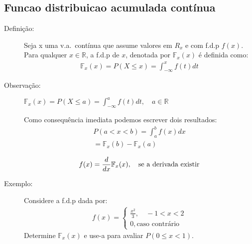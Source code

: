  \subsection{Funcao distribuicao acumulada contínua}
 \begin{description}
   \item [Definição:] Seja x uma v.a.\ contínua que assume valores em $R_{x}$ e com 
     f.d.p $f(x)$. Para qualquer $x \in \mathbb{R}$, a f.d.p de $x$, denotada por 
     $\mathbb{F}_{x}(x)$ é definida como: 
     \begin{align}
       \mathbb{F}_{x}(x)= P(X \le x)= \int_{- \infty}^{x} f(t)dt 
     \end{align}
   \item [Observação:] $\mathbb{F}_{x}(x)= P(X \le a)= \int_{-\infty}^{a} f(t)dt , \quad a \in \mathbb{R}$

     Como consequência imediata podemos escrever dois resultados: 
     \begin{align}
       P(a <x<b)= \int_{a}^{b} f(x)dx\\
       = \mathbb{F}_{x}(b)-\mathbb{F}_{x}(a)
     \end{align}

     \begin{align}
       f(x)=\frac{d}{dx}\mathbb{F}_{x}(x), \text{\quad se a derivada existir}
     \end{align}

   \item [ Exemplo: ] Considere a f.d.p dada por: 
     \begin{align*}
       f(x)= 
       \begin{cases}
         \frac{x^2}{3},\quad  -1 < x < 2 \\
         0, \text{caso contrário}
       \end{cases}
     \end{align*}
     Determine $\mathbb{F}_{x}(x)$ e use-a para avaliar $P(0 \le x< 1)$.


\end{description}
